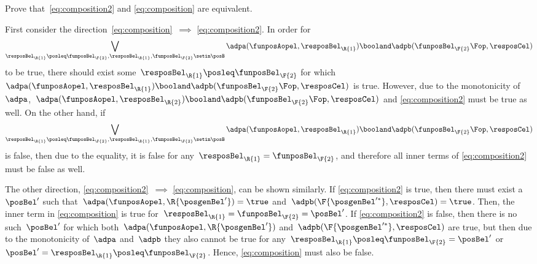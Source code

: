 \begin{exercise}
    \label{ex:composition_equivalency}
    Prove that~\cref{eq:composition2} and \cref{eq:composition} are equivalent.
\end{exercise}
%
\begin{solution}
    First consider the direction~\cref{eq:composition}~$\implies$ \cref{eq:composition2}.
    In order for%
    \begin{equation}
        \bigvee_{\resposBel_\R{1}\posleq\funposBel_\F{2}, \resposBel_\R{1},\funposBel_\F{2}\setin \posB} \adpa(\funposAopel,\resposBel_\R{1}) \booland \adpb(\funposBel_\F{2}\Fop,\resposCel)%
    \end{equation}
    to be true, there should exist some~$\resposBel_\R{1}\posleq \funposBel_\F{2}$ for which~$\adpa(\funposAopel,\resposBel_\R{1}) \booland\adpb(\funposBel_\F{2}\Fop,\resposCel)$ is true.
    However, due to the monotonicity of~$\adpa$,~$\adpa(\funposAopel,\resposBel_\R{2}) \booland \adpb(\funposBel_\F{2}\Fop,\resposCel)$ and \cref{eq:composition2} must be true as well.
    On the other hand, if%
    \begin{equation}
        \bigvee_{\resposBel_\R{1}\posleq\funposBel_\F{2}, \resposBel_\R{1},\funposBel_\F{2}\setin \posB} \adpa(\funposAopel,\resposBel_\R{1}) \booland \adpb(\funposBel_\F{2}\Fop,\resposCel)%
    \end{equation}
    is false, then due to the equality, it is false for any~$\resposBel_\R{1}=\funposBel_\F{2}$, and therefore all inner terms of \cref{eq:composition2} must be false as well.

    The other direction, \cref{eq:composition2}~$\implies$ \cref{eq:composition}, can be shown similarly.
    If \cref{eq:composition2} is true, then there must exist a~$\posBel'$ such that~$\adpa(\funposAopel, \R{\posgenBel'})=\true$ and~$\adpb(\F{\posgenBel'^*}, \resposCel)=\true$.
    Then, the inner term in \cref{eq:composition} is true for~$\resposBel_\R{1}=\funposBel_\F{2}=\posBel'$.
    If \cref{eq:composition2} is false, then there is no such~$\posBel'$ for which both~$\adpa(\funposAopel, \R{\posgenBel'})$ and~$\adpb(\F{\posgenBel'^*}, \resposCel)$ are true, but then due to the monotonicity of~$\adpa$ and~$\adpb$ they also cannot be true for any~$\resposBel_\R{1} \posleq \funposBel_\F{2} = \posBel'$ or~$\posBel'=\resposBel_\R{1} \posleq \funposBel_\F{2}$.
    Hence, \cref{eq:composition} must also be false.
\end{solution}

